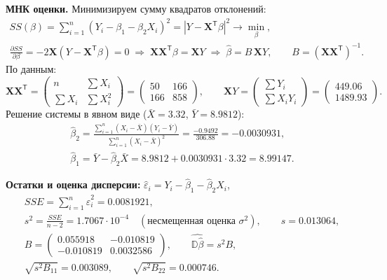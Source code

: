 \documentclass[12pt]{spbstu-task}
\newcommand{\D}{\mathbb{D}}
\newcommand{\Xm}{\mathbf{X}}
\begin{document}
\textbf{МНК оценки.} Минимизируем сумму квадратов отклонений:
\begin{gather*}
  SS(\beta) = \sum_{i=1}^{n}\left(Y_i - \beta_1 - \beta_2 X_i\right)^2 = \left|Y - \Xm^{\mathsf{T}}\beta\right|^2 \to \min_\beta,\\
  \frac{\partial SS}{\partial\beta} = -2\Xm\left(Y - \Xm^{\mathsf{T}}\beta\right) = 0
  \;\Rightarrow\; \Xm\Xm^{\mathsf{T}}\beta = \Xm Y
  \;\Rightarrow\; \hat{\beta} = B\,\Xm Y,\qquad B = \left(\Xm\Xm^{\mathsf{T}}\right)^{-1}.
\end{gather*}
По данным:
\begin{displaymath}
  \Xm\Xm^{\mathsf{T}} = \begin{pmatrix} n & \sum X_i \\ \sum X_i & \sum X_i^2 \end{pmatrix}
  = \begin{pmatrix} 50 & 166 \\ 166 & 858 \end{pmatrix},\qquad
  \Xm Y = \begin{pmatrix} \sum Y_i \\ \sum X_i Y_i \end{pmatrix} = \begin{pmatrix} 449.06 \\ 1489.93 \end{pmatrix}.
\end{displaymath}
Решение системы в явном виде (\(\bar{X} = 3.32\), \(\bar{Y} = 8.9812\)):
\begin{gather*}
  \hat{\beta}_2 = \frac{\sum_{i=1}^{n}(X_i - \bar{X})(Y_i - \bar{Y})}{\sum_{i=1}^{n}(X_i - \bar{X})^2}
  = \frac{-0.9492}{306.88} = -0.0030931,\\
  \hat{\beta}_1 = \bar{Y} - \hat{\beta}_2\bar{X} = 8.9812 + 0.0030931\cdot 3.32 = 8.99147.
\end{gather*}

\textbf{Остатки и оценка дисперсии:} \(\hat{\varepsilon}_i = Y_i - \hat{\beta}_1 - \hat{\beta}_2 X_i\),
\begin{gather*}
  SSE = \sum_{i=1}^{n}\hat{\varepsilon}_i^2 = 0.0081921,\\
  s^2 = \frac{SSE}{n - 2} = 1.7067\cdot 10^{-4}\quad(\text{несмещенная оценка } \sigma^2),\qquad s = 0.013064,\\
  B = \begin{pmatrix} 0.055918 & -0.010819 \\ -0.010819 & 0.0032586 \end{pmatrix},\qquad
  \widehat{\D\hat{\beta}} = s^2B,\\
  \sqrt{s^2B_{11}} = 0.003089,\qquad \sqrt{s^2B_{22}} = 0.000746.
\end{gather*}
\end{document}
